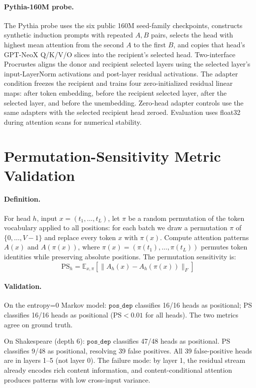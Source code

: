 \documentclass[final]{article}
\begin{document}
\paragraph{Pythia-160M probe.}
The Pythia probe uses the six public 160M seed-family checkpoints,
constructs synthetic induction prompts with repeated $A,B$ pairs, selects the
head with highest mean attention from the second $A$ to the first $B$, and
copies that head's GPT-NeoX Q/K/V/O slices into the recipient's selected head.
Two-interface Procrustes aligns the donor and recipient selected layers using
the selected layer's input-LayerNorm activations and post-layer residual
activations. The adapter condition freezes the recipient and trains four
zero-initialized residual linear maps: after token embedding, before the
recipient selected layer, after the selected layer, and before the unembedding.
Zero-head adapter controls use the same adapters with the selected recipient
head zeroed. Evaluation uses float32 during attention scans for numerical
stability.

\section{Permutation-Sensitivity Metric Validation}
\label{app:permtest}

\paragraph{Definition.}
For head $h$, input $x = (t_1, \ldots, t_L)$, let $\pi$ be a random permutation
of the token vocabulary applied to all positions: for each batch we draw a
permutation $\pi$ of $\{0, \ldots, V-1\}$ and replace every token $x$ with
$\pi(x)$. Compute attention patterns $A(x)$ and $A(\pi(x))$, where
$\pi(x) = (\pi(t_1), \ldots, \pi(t_L))$ permutes token identities while
preserving absolute positions. The permutation sensitivity is:
\[
  \text{PS}_h = \mathbb{E}_{x, \pi} \left[ \|A_h(x) - A_h(\pi(x))\|_F \right]
\]

\paragraph{Validation.}
On the entropy=0 Markov model: $\mathtt{pos\_dep}$ classifies 16/16 heads as
positional; $\text{PS}$ classifies 16/16 heads as positional ($\text{PS} < 0.01$
for all heads). The two metrics agree on ground truth.

On Shakespeare (depth 6): $\mathtt{pos\_dep}$ classifies 47/48 heads as
positional. $\text{PS}$ classifies 9/48 as positional, resolving 39 false
positives. All 39 false-positive heads are in layers 1--5 (not layer 0). The
failure mode: by layer 1, the residual stream already encodes rich content
information, and content-conditional attention produces patterns with low
cross-input variance.
\end{document}
